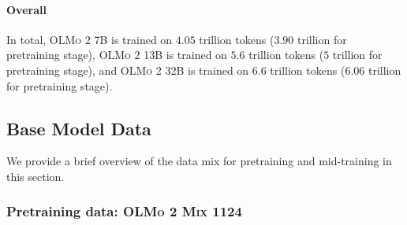 \documentclass[table]{ai2style/ai2}
\newcommand{\olmotoo}{\textsc{OLMo 2}\xspace}
\newcommand{\olmomix}{\textsc{OLMo 2 Mix 1124}\xspace}
\begin{document}
\paragraph{Overall} In total, \olmotoo 7B is trained on $4.05$ trillion tokens ($3.90$ trillion for pretraining stage), \olmotoo 13B is trained on $5.6$ trillion tokens ($5$ trillion for pretraining stage), and \olmotoo 32B is trained on $6.6$ trillion tokens  ($6.06$ trillion for pretraining stage).

\subsection{Base Model Data}
\label{sec:pretrain-data}

We provide a brief overview of the data mix for pretraining and mid-training in this section.

\subsubsection{Pretraining data: \olmomix}
\end{document}
